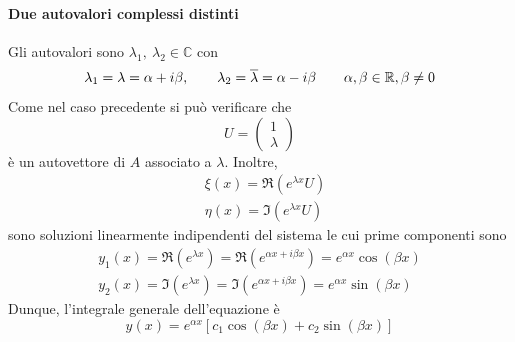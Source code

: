 \paragraph{Due autovalori complessi distinti}
Gli autovalori sono $\lambda_1,\ \lambda_2 \in \mathbb{C}$ con
\begin{equation}
    \lambda_1=\lambda= \alpha+ i\beta, \qquad
    \lambda_2=\overline{\lambda}= \alpha- i\beta \qquad \alpha, \beta \in \mathbb{R}, \beta \neq0
\end{equation}
Come nel caso precedente si può verificare che
\begin{equation}
    U = \begin{pmatrix}
        1\\ 
        \lambda
        \end{pmatrix}
\end{equation}
è un autovettore di $A$ associato a $\lambda$. Inoltre,
\begin{align}
    &\xi(x) = \Re(e^{\lambda x}U)\\
    &\eta(x)= \Im(e^{\lambda x}U)
\end{align}
sono soluzioni linearmente indipendenti del sistema le cui prime componenti sono 
\begin{align}
    y_1(x)=\Re\left(e^{\lambda x}\right) = \Re\left(e^{\alpha x + i \beta x}\right)=e^{\alpha x} \cos(\beta x)\\
    y_2(x)=\Im\left(e^{\lambda x }\right)=\Im\left(e^{\alpha x + i \beta x}\right)=e^{\alpha x} \sin(\beta x)
\end{align}
Dunque, l'integrale generale dell'equazione è
\begin{equation}
    y(x)=e^{\alpha x}[c_1 \cos(\beta
    x) + c_2\sin(\beta x)]
\end{equation}
